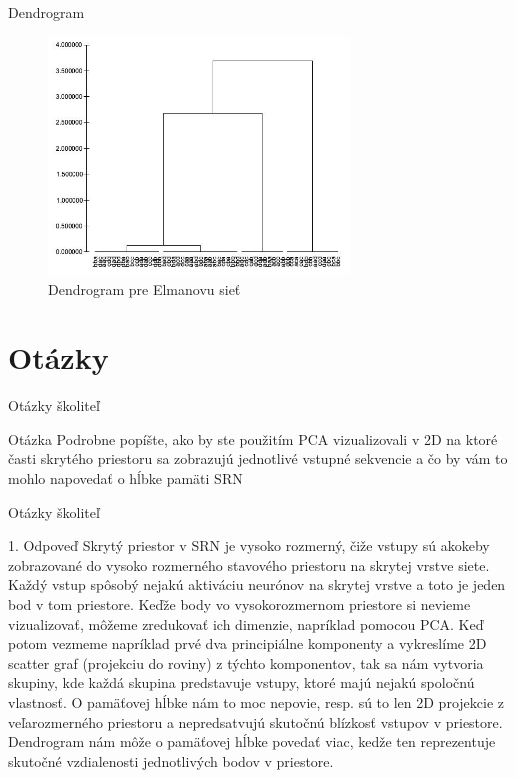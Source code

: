 \documentclass[10pt]{beamer}
\begin{document}
\begin{frame}[fragile]{Dendrogram}
\begin{figure}[H]
  \centering
  \includegraphics[width=8cm]{assets/dendrogram}
  \caption{Dendrogram pre Elmanovu sieť}
  \label{dendrogram}
\end{figure}
\end{frame}

\section{Otázky}
\begin{frame}{Otázky školiteľ}
  
  \begin{block}{Otázka}
    Podrobne popíšte, ako by ste použitím PCA vizualizovali v 2D na ktoré časti skrytého priestoru sa zobrazujú jednotlivé vstupné sekvencie a čo by vám to mohlo napovedať o hĺbke pamäti SRN
  \end{block}  

\end{frame}


\begin{frame}{Otázky školiteľ}
  \begin{block}{1. Odpoveď}
    Skrytý priestor v SRN je vysoko rozmerný, čiže vstupy sú akokeby zobrazované do vysoko rozmerného stavového priestoru na skrytej vrstve siete.  
    Každý vstup spôsobý nejakú aktiváciu neurónov na skrytej vrstve a toto je jeden bod v tom priestore.
    Keďže body vo vysokorozmernom priestore si nevieme vizualizovať, môžeme zredukovať ich dimenzie, napríklad pomocou PCA. 
    Keď potom vezmeme napríklad prvé dva principiálne komponenty a vykreslíme 2D scatter graf (projekciu do roviny) z týchto komponentov, tak sa nám vytvoria skupiny, kde každá skupina predstavuje vstupy, ktoré majú nejakú spoločnú vlastnosť.
    O pamäťovej hĺbke nám to moc nepovie, resp. sú to len 2D projekcie z veľarozmerného priestoru a nepredsatvujú skutočnú blízkosť vstupov v priestore.
    Dendrogram nám môže o pamäťovej hĺbke povedať viac, kedže ten reprezentuje skutočné vzdialenosti jednotlivých bodov v priestore.
  \end{block}  
\end{frame}
  
\end{document}
